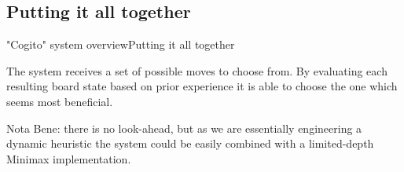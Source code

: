 \subsection{Putting it all together}
\begin{frame}{"Cogito" system overview}{Putting it all together}

The system receives a set of possible moves to choose from. By evaluating each 
resulting board state based on prior experience it is able to choose the one 
which seems most beneficial.

Nota Bene: there is no look-ahead, but as we are essentially engineering a 
dynamic heuristic the system could be easily combined with a limited-depth 
Minimax implementation.

\end{frame}